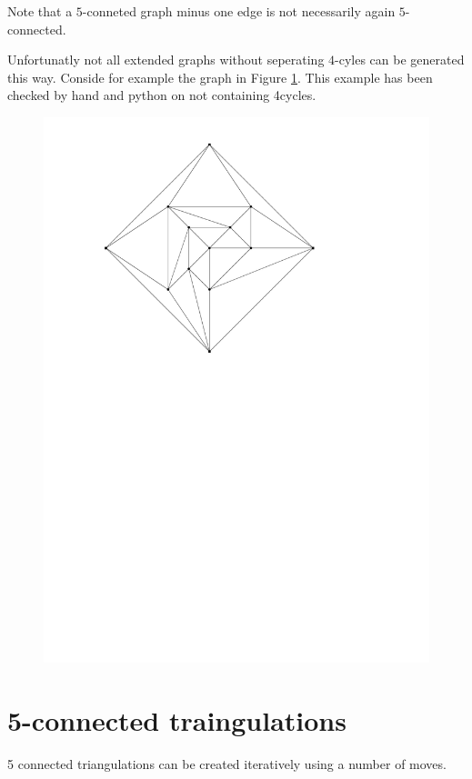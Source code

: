 Note that a $5$-conneted graph minus one edge is not necessarily again $5$-connected.

Unfortunatly not all extended graphs without seperating $4$-cyles can be generated this way. Conside for example the graph in Figure \ref{fig:ure}. This example has been checked by hand and python on not containing 4cycles.

\begin{figure}[h]
  \centering
  \includegraphics[scale=1]{NoSeperating4CycleButAdddingEdgeBackInIsBad.pdf}
  \caption{}
  \label{fig:ure}
\end{figure}

\section{5-connected traingulations}
5 connected triangulations can be created iteratively using a number of moves.






\printbibliography

